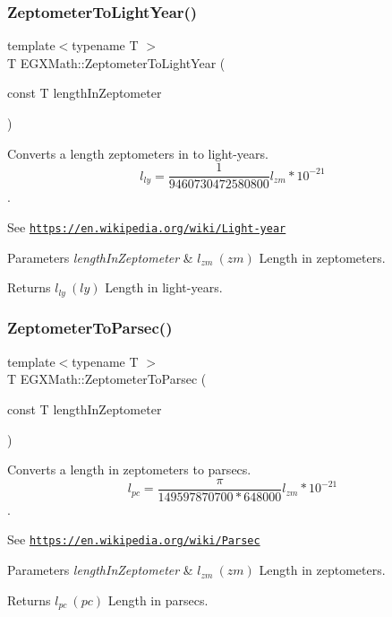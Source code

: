 \subsubsection{\texorpdfstring{Zeptometer\+To\+Light\+Year()}{ZeptometerToLightYear()}}
{\footnotesize\ttfamily template$<$typename T $>$ \\
T E\+G\+X\+Math\+::\+Zeptometer\+To\+Light\+Year (\begin{DoxyParamCaption}\item[{const T}]{length\+In\+Zeptometer }\end{DoxyParamCaption})}



Converts a length zeptometers in to light-\/years. \[ l_{ly}= \frac{1}{9460730472580800} l_{zm} * 10^{-21} \]. 

See \href{https://en.wikipedia.org/wiki/Light-year}{\tt https\+://en.\+wikipedia.\+org/wiki/\+Light-\/year} 
\begin{DoxyParams}{Parameters}
{\em length\+In\+Zeptometer} & $ l_{zm}\ (zm)$ Length in zeptometers. \\
\hline
\end{DoxyParams}
\begin{DoxyReturn}{Returns}
$ l_{ly}\ (ly)$ Length in light-\/years. 
\end{DoxyReturn}
\mbox{\label{group___e_g_x_math-_conversions-_length_conversions-_zeptometer-_astronomical_gac8c853b247f3b577cee5510bd43fcd65}} 
\subsubsection{\texorpdfstring{Zeptometer\+To\+Parsec()}{ZeptometerToParsec()}}
{\footnotesize\ttfamily template$<$typename T $>$ \\
T E\+G\+X\+Math\+::\+Zeptometer\+To\+Parsec (\begin{DoxyParamCaption}\item[{const T}]{length\+In\+Zeptometer }\end{DoxyParamCaption})}



Converts a length in zeptometers to parsecs. \[ l_{pc}=\frac{\pi}{149597870700 * 648000} l_{zm} * 10^{-21} \]. 

See \href{https://en.wikipedia.org/wiki/Parsec}{\tt https\+://en.\+wikipedia.\+org/wiki/\+Parsec} 
\begin{DoxyParams}{Parameters}
{\em length\+In\+Zeptometer} & $ l_{zm}\ (zm)$ Length in zeptometers. \\
\hline
\end{DoxyParams}
\begin{DoxyReturn}{Returns}
$ l_{pc}\ (pc)$ Length in parsecs. 
\end{DoxyReturn}
